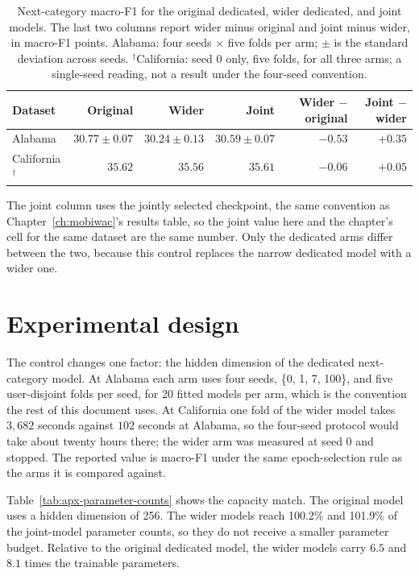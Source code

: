 \begin{table}[H]
    \centering
    \caption{Next-category macro-F1 for the original dedicated, wider dedicated,
    and joint models. The last two columns report wider minus original and joint
    minus wider, in macro-F1 points. Alabama: four seeds $\times$ five folds per arm;
    $\pm$ is the standard deviation across seeds. $^{\dagger}$California: seed 0 only,
    five folds, for all three arms; a single-seed reading, not a result under the
    four-seed convention.}
    \label{tab:apx-parameter-comparison}
    {\small
    \setlength{\tabcolsep}{4pt}
    \begin{tabular}{lrrrrr}
        \toprule
        Dataset & Original & Wider & Joint & Wider $-$ original & Joint $-$ wider \\
        \midrule
        Alabama                  & $30.77 \pm 0.07$ & $30.24 \pm 0.13$ & $30.59 \pm 0.07$ & $-0.53$ & $+0.35$ \\
        California$^{\dagger}$   & $35.62$           & $35.56$           & $35.61$           & $-0.06$ & $+0.05$ \\
        \bottomrule
    \end{tabular}
    }
\end{table}

The joint column uses the jointly selected checkpoint, the same convention as
Chapter~\ref{ch:mobiwac}'s results table, so the joint value here and the chapter's cell for the
same dataset are the same number. Only the dedicated arms differ between the two, because this
control replaces the narrow dedicated model with a wider one.

\section{Experimental design}
\label{sec:apx-parameter-design}

The control changes one factor: the hidden dimension of the dedicated
next-category model. At Alabama each arm uses four seeds, \{0, 1, 7, 100\}, and five
user-disjoint folds per seed, for 20 fitted models per arm, which is the convention the rest of
this document uses. At California one fold of the wider model takes $3{,}682$ seconds against
$102$ seconds at Alabama, so the four-seed protocol would take about twenty hours there; the
wider arm was measured at seed 0 and stopped. The reported value is macro-F1 under the same
epoch-selection rule as the arms it is compared against.

Table~\ref{tab:apx-parameter-counts} shows the capacity match. The original model
uses a hidden dimension of 256. The wider models reach 100.2\% and 101.9\% of the
joint-model parameter counts, so they do not receive a smaller parameter budget. Relative to the
original dedicated model, the wider models carry $6.5$ and $8.1$ times the trainable parameters.

